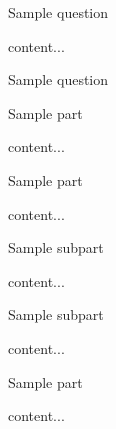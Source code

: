 \documentclass[11pt]{article} %
\begin{document}
\begin{qstn}[9]
	Sample question
\begin{soln}
	content...
\end{soln}
\end{qstn}

\begin{qstn}[10]
	Sample question
\begin{assgnenum}
	\qitem Sample part
	\begin{soln}
		content...
	\end{soln}
	\qitem Sample part
	\begin{soln}
		content...
	\end{soln}
	\begin{assgnenum}
		\qitem Sample subpart
		\begin{soln}
			content...
		\end{soln}
		\qitem Sample subpart
		\begin{soln}
			content...
		\end{soln}
	\end{assgnenum}
	\qitem Sample part
	\begin{soln}
		content...
	\end{soln}
\end{assgnenum}
\end{qstn}
\end{document}
